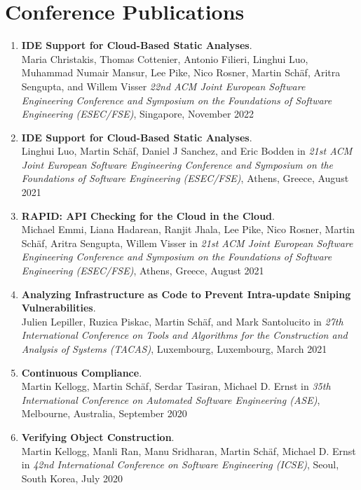 \section{\sc Conference Publications}


\begin{enumerate}

\item \textbf{IDE Support for Cloud-Based Static Analyses}.
\\ Maria Christakis, Thomas Cottenier, Antonio Filieri, Linghui Luo, Muhammad Numair Mansur, Lee Pike, Nico Rosner, Martin Sch\"af, Aritra Sengupta, and Willem Visser
\emph{22nd ACM Joint European Software Engineering Conference and Symposium on the Foundations of Software Engineering (ESEC/FSE)},
Singapore, November 2022

\item \textbf{IDE Support for Cloud-Based Static Analyses}.
\\ Linghui Luo, Martin Sch\"af, Daniel J Sanchez, and Eric Bodden in 
\emph{21st ACM Joint European Software Engineering Conference and Symposium on the Foundations of Software Engineering (ESEC/FSE)},
Athens, Greece, August 2021

\item \textbf{RAPID: API Checking for the Cloud in the Cloud}.
\\ Michael Emmi, Liana Hadarean, Ranjit Jhala, Lee Pike, Nico Rosner, Martin Sch\"af, Aritra Sengupta, Willem Visser in 
\emph{21st ACM Joint European Software Engineering Conference and Symposium on the Foundations of Software Engineering (ESEC/FSE)},
Athens, Greece, August 2021

\item \textbf{Analyzing Infrastructure as Code to Prevent Intra-update Sniping Vulnerabilities}.
\\ Julien Lepiller, Ruzica Piskac, Martin Sch\"af, and Mark Santolucito in 
\emph{27th International Conference on Tools and Algorithms for the Construction and Analysis of Systems (TACAS)},
Luxembourg, Luxembourg, March 2021

\item \textbf{Continuous Compliance}.
\\ Martin Kellogg, Martin Sch\"af, Serdar Tasiran, Michael D. Ernst in 
\emph{35th International Conference on Automated Software Engineering (ASE)},
Melbourne, Australia, September 2020

\item \textbf{Verifying Object Construction}.
\\ Martin Kellogg, Manli Ran, Manu Sridharan, Martin Sch\"af, Michael D. Ernst in 
\emph{42nd International Conference on Software Engineering (ICSE)},
Seoul, South Korea, July 2020


\end{enumerate}
